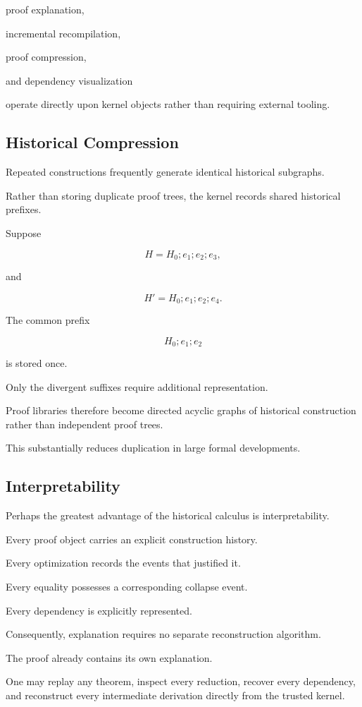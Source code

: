 \documentclass[12pt,oneside]{article}
\theoremstyle{definition}
\theoremstyle{remark}
\begin{document}
proof explanation,

incremental recompilation,

proof compression,

and dependency visualization

operate directly upon kernel objects rather than requiring external tooling.

\subsection{Historical Compression}

Repeated constructions frequently generate identical historical subgraphs.

Rather than storing duplicate proof trees, the kernel records shared historical
prefixes.

Suppose

\[
H
=
H_0;
e_1;
e_2;
e_3,
\]

and

\[
H'
=
H_0;
e_1;
e_2;
e_4.
\]

The common prefix

\[
H_0;
e_1;
e_2
\]

is stored once.

Only the divergent suffixes require additional representation.

Proof libraries therefore become directed acyclic graphs of historical
construction rather than independent proof trees.

This substantially reduces duplication in large formal developments.

\subsection{Interpretability}

Perhaps the greatest advantage of the historical calculus is interpretability.

Every proof object carries an explicit construction history.

Every optimization records the events that justified it.

Every equality possesses a corresponding collapse event.

Every dependency is explicitly represented.

Consequently, explanation requires no separate reconstruction algorithm.

The proof already contains its own explanation.

One may replay any theorem, inspect every reduction, recover every dependency,
and reconstruct every intermediate derivation directly from the trusted kernel.
\end{document}

